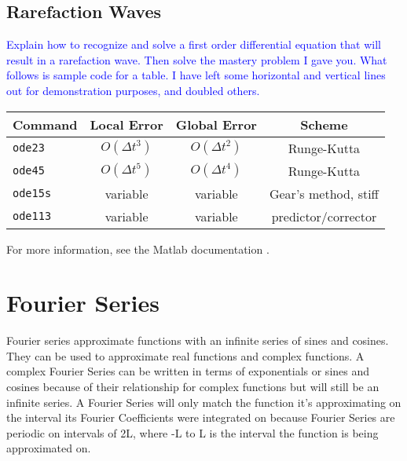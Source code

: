 \documentclass{article}
\newcommand{\blue}[1]{\textcolor{blue}{#1}}
\begin{document}
\subsection{Rarefaction Waves}
\blue{Explain how to recognize and solve a first order differential equation that will result in a rarefaction wave. Then solve the mastery problem I gave you. What follows is sample code for a table. I have left some horizontal and vertical lines out for demonstration purposes, and doubled others.}
\begin{center}
\begin{tabular}{|l|ccc|} \hline
\textbf{Command} & \textbf{Local Error} & \textbf{Global Error} & \textbf{Scheme} \\ \hline \hline  
  \texttt{ode23} & $O(\Delta t^3)$ & $O(\Delta t^2)$ & Runge-Kutta\\
  \texttt{ode45} & $O(\Delta t^5)$ & $O(\Delta t^4)$ & Runge-Kutta \\ \hline
  \texttt{ode15s} & variable  & variable & Gear's method, stiff\\
  \texttt{ode113} & variable & variable & predictor/corrector \\ \hline
  \end{tabular}
  \end{center}
For more information, see the Matlab documentation \cite{matlabode}.
\section{Fourier Series}
Fourier series approximate functions with an infinite series of sines and cosines. They can be used to approximate real functions and complex functions. A complex Fourier Series can be written in terms of exponentials or sines and cosines because of their relationship for complex functions but will still be an infinite series. \newline
A Fourier Series will only match the function it's approximating on the interval its Fourier Coefficients were integrated on because Fourier Series are periodic on intervals of 2L, where -L to L is the interval the function is being approximated on. 
\end{document}
